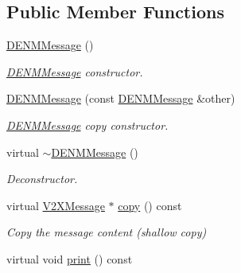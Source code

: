 \subsection*{Public Member Functions}
\begin{DoxyCompactItemize}
\item 
\hyperlink{classDENMMessage_a2e336f6000a1a339b8a5674ae525fb57}{D\+E\+N\+M\+Message} ()\hypertarget{classDENMMessage_a2e336f6000a1a339b8a5674ae525fb57}{}\label{classDENMMessage_a2e336f6000a1a339b8a5674ae525fb57}

\begin{DoxyCompactList}\small\item\em \hyperlink{classDENMMessage}{D\+E\+N\+M\+Message} constructor. \end{DoxyCompactList}\item 
\hyperlink{classDENMMessage_a313edd168c148ef63baaba84ebf29004}{D\+E\+N\+M\+Message} (const \hyperlink{classDENMMessage}{D\+E\+N\+M\+Message} \&other)
\begin{DoxyCompactList}\small\item\em \hyperlink{classDENMMessage}{D\+E\+N\+M\+Message} copy constructor. \end{DoxyCompactList}\item 
virtual \hyperlink{classDENMMessage_a453feabe025e290fbc23d6e163db7fa9}{$\sim$\+D\+E\+N\+M\+Message} ()\hypertarget{classDENMMessage_a453feabe025e290fbc23d6e163db7fa9}{}\label{classDENMMessage_a453feabe025e290fbc23d6e163db7fa9}

\begin{DoxyCompactList}\small\item\em Deconstructor. \end{DoxyCompactList}\item 
virtual \hyperlink{classV2XMessage}{V2\+X\+Message} $\ast$ \hyperlink{classDENMMessage_aae291a9abf0f99c9c54500ec2e716bea}{copy} () const 
\begin{DoxyCompactList}\small\item\em Copy the message content (shallow copy) \end{DoxyCompactList}\item 
virtual void \hyperlink{classDENMMessage_a0a375d746340b2b762ddc24205a67f58}{print} () const \hypertarget{classDENMMessage_a0a375d746340b2b762ddc24205a67f58}{}\label{classDENMMessage_a0a375d746340b2b762ddc24205a67f58}


\end{DoxyCompactItemize}
